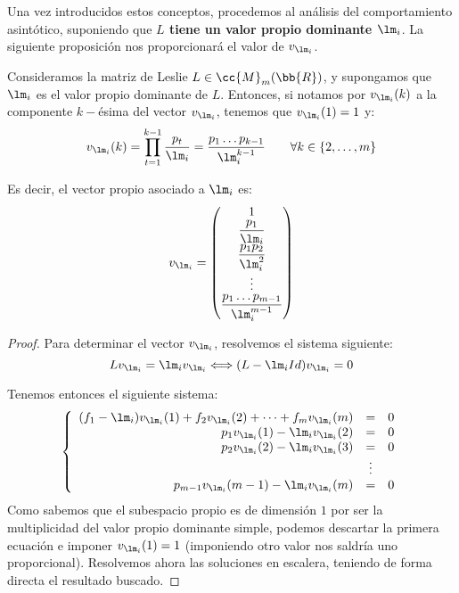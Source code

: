 Una vez introducidos estos conceptos, procedemos al análisis del comportamiento asintótico, suponiendo que \textbf{$L$ tiene un valor propio dominante $\lm_i$}. La siguiente proposición nos proporcionará el valor de $v_{\lm_i}$.
\begin{prop}
    Consideramos la matriz de Leslie $L\in \cc{M}_m(\bb{R})$, y supongamos que $\lm_i$ es el valor propio dominante de $L$. Entonces, si notamos por $v_{\lm_i}(k)$ a la componente $k-$ésima del vector $v_{\lm_i}$, tenemos que $v_{\lm_i}(1)=1$ y:
    \begin{equation*}
        v_{\lm_i}(k) = \prod_{t=1}^{k-1} \frac{p_t}{\lm_i} = \dfrac{p_1\ldots p_{k-1}}{\lm_i^{k-1}} \qquad \forall k \in \{2, \ldots, m\}
    \end{equation*}
    
    Es decir, el vector propio asociado a $\lm_i$ es: 
    \begin{equation*}
        v_{\lm_i} = \begin{pmatrix}
            1 \\
            \dfrac{p_1}{\lm_i} \\
            \dfrac{p_1p_2}{\lm_i^2}\\
            \vdots\\
            \dfrac{p_1\dots p_{m-1}}{\lm_i^{m-1}}
        \end{pmatrix}
    \end{equation*}
    \begin{proof}
        Para determinar el vector $v_{\lm_i}$, resolvemos el sistema siguiente:
        \begin{equation*}
            Lv_{\lm_i} = \lm_i v_{\lm_i}
            \Longleftrightarrow
            (L-\lm_iId)v_{\lm_i} = 0
        \end{equation*}

        Tenemos entonces el siguiente sistema:
        \begin{equation*}
            \left\{
            \begin{array}{rcl}
                (f_1-\lm_i)v_{\lm_i}(1) + f_2v_{\lm_i}(2) + \dots + f_mv_{\lm_i}(m) &=& 0\\
                p_1v_{\lm_i}(1) -\lm_iv_{\lm_i}(2) &=& 0\\
                p_2v_{\lm_i}(2) -\lm_iv_{\lm_i}(3) &=& 0\\
                &\vdots&\\
                p_{m-1}v_{\lm_i}(m-1) -\lm_iv_{\lm_i}(m) &=&0
            \end{array}
            \right.
        \end{equation*}
        Como sabemos que el subespacio propio es de dimensión $1$ por ser la multiplicidad del valor propio dominante simple, podemos descartar la primera ecuación e imponer $v_{\lm_i}(1)=1$ (imponiendo otro valor nos saldría uno proporcional). Resolvemos ahora las soluciones en escalera, teniendo de forma directa el resultado buscado.
    \end{proof}
\end{prop}


